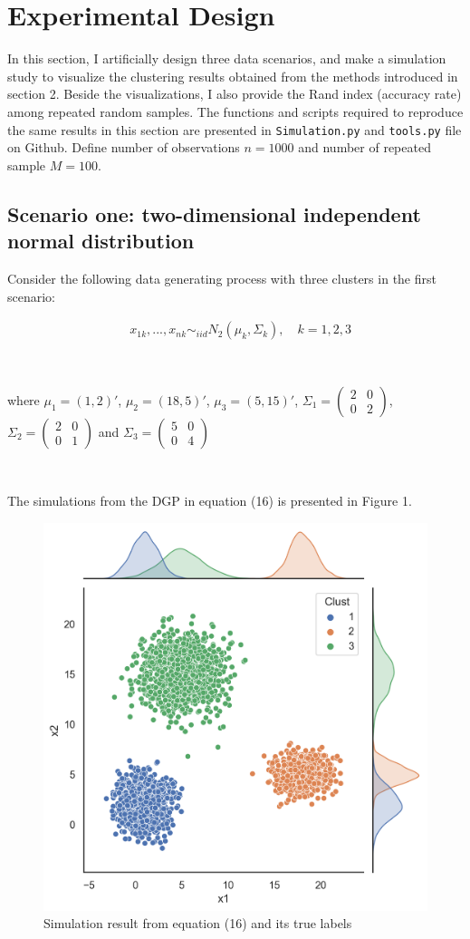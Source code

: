 \documentclass[a4paper]{article}
\begin{document}
\section{Experimental Design}
In this section, I artificially design three data scenarios, and make a simulation study to visualize the clustering results obtained from the methods introduced in section 2. Beside the visualizations, I also provide the Rand index (accuracy rate) among repeated random samples. The functions and scripts required to reproduce the same results in this section are presented in \texttt{Simulation.py} and \texttt{tools.py} file on Github. Define number of observations $n=1000$ and number of repeated sample $M=100$.

\subsection{Scenario one: two-dimensional independent normal distribution}

Consider the following data generating process with three clusters in the first scenario:

\begin{align}
	& x_{1k}, ..., x_{nk} \sim_{iid} N_2 (\mu_k,  \Sigma_k), \quad k = 1, 2, 3
\end{align}

\

where $\mu_1 = (1, 2)'$, $\mu_2 = (18, 5)'$, $\mu_3 = (5, 15)'$, 
$\Sigma_1 = \left( \begin{smallmatrix} 2&0\\ 0&2 \end{smallmatrix} \right)$, $\Sigma_2 = \left( \begin{smallmatrix} 2&0\\ 0&1 \end{smallmatrix} \right)$ and $\Sigma_3 = \left( \begin{smallmatrix} 5&0\\ 0&4 \end{smallmatrix} \right)$

\

The simulations from the DGP in equation (16) is presented in Figure 1. 

\begin{figure}[h!]
  \centering
  \includegraphics[width=0.45\linewidth]{../Simu_results/sen1.png}
  \caption{Simulation result from equation (16) and its true labels}
  \label{fig:sec}
\end{figure}
\end{document}

